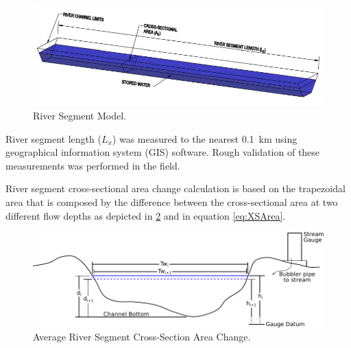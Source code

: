 \begin{linenumbers}
\begin{figure}[htbp]
	\begin{center}
		\includegraphics[scale=1]{"Figures/SEGMENT small"}
		\caption[River Segment Model.]{River Segment Model.}
		\label{fig:segment model}
	\end{center}
\end{figure}

River segment length ($L_x$) was measured to the nearest \SI{0.1}{\kilo\meter} using geographical information system (GIS) software.  Rough validation of these measurements was performed in the field.

River segment cross-sectional area change calculation is based on the trapezoidal area that is composed by the difference between the cross-sectional area at two different flow depths as depicted in \ref{fig:XSArea} and in equation \ref{eq:XSArea}.

\begin{figure}[htbp]
\begin{center}
	\includegraphics[width=6in]{Figures/LineDiagram/XSection}
	\caption[Average River Segment Cross-Section Area Change.]{Average River Segment Cross-Section Area Change.}
	\label{fig:XSArea}
\end{center}
\end{figure}


\end{linenumbers}

